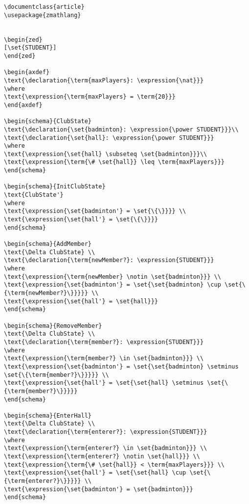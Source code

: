 \begin{verbatim}
\documentclass{article}
\usepackage{zmathlang}


\begin{zed}
[\set{STUDENT}]
\end{zed}

\begin{axdef}
\text{\declaration{\term{maxPlayers}: \expression{\nat}}}
\where
\text{\expression{\term{maxPlayers} = \term{20}}}
\end{axdef}

\begin{schema}{ClubState}
\text{\declaration{\set{badminton}: \expression{\power STUDENT}}}\\
\text{\declaration{\set{hall}: \expression{\power STUDENT}}}
\where
\text{\expression{\set{hall} \subseteq \set{badminton}}}\\
\text{\expression{\term{\# \set{hall}} \leq \term{maxPlayers}}}
\end{schema}

\begin{schema}{InitClubState}
\text{ClubState'}
\where
\text{\expression{\set{badminton'} = \set{\{\}}}} \\
\text{\expression{\set{hall'} = \set{\{\}}}}
\end{schema}

\begin{schema}{AddMember}
\text{\Delta ClubState} \\
\text{\declaration{\term{newMember?}: \expression{STUDENT}}}
\where
\text{\expression{\term{newMember} \notin \set{badminton}}} \\
\text{\expression{\set{badminton'} = \set{\set{badminton} \cup \set{\{\term{newMember?}\}}}}} \\
\text{\expression{\set{hall'} = \set{hall}}}
\end{schema}

\begin{schema}{RemoveMember}
\text{\Delta ClubState} \\
\text{\declaration{\term{member?}: \expression{STUDENT}}}
\where
\text{\expression{\term{member?} \in \set{badminton}}} \\
\text{\expression{\set{badminton'} = \set{\set{badminton} \setminus \set{\{\term{member?}\}}}}} \\
\text{\expression{\set{hall'} = \set{\set{hall} \setminus \set{\{\term{member?}\}}}}}
\end{schema}

\begin{schema}{EnterHall}
\text{\Delta ClubState} \\
\text{\declaration{\term{enterer?}: \expression{STUDENT}}}
\where
\text{\expression{\term{enterer?} \in \set{badminton}}} \\
\text{\expression{\term{enterer?} \notin \set{hall}}} \\
\text{\expression{\term{\# \set{hall}} < \term{maxPlayers}}} \\
\text{\expression{\set{hall'} = \set{\set{hall} \cup \set{\{\term{enterer?}\}}}}} \\
\text{\expression{\set{badminton'} = \set{badminton}}}
\end{schema}


\end{verbatim}
